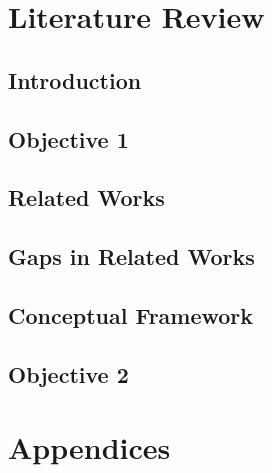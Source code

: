 \documentclass[12pt, a4paper]{article}
\begin{document}
\clearpage
\section{Literature Review}
\subsection{Introduction}
\subsection{Objective 1}
\subsection{Related Works}
\subsection{Gaps in Related Works}
\subsection{Conceptual Framework}
\subsection{Objective 2}
\clearpage


\clearpage
\section*{Appendices}
\end{document}
